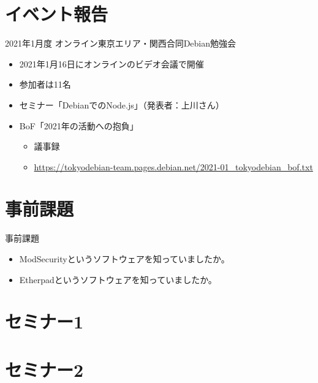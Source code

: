 \section{イベント報告}

\begin{frame}{2021年1月度 オンライン東京エリア・関西合同Debian勉強会}
\begin{itemize}
\item 2021年1月16日にオンラインのビデオ会議で開催
\item 参加者は11名
\item セミナー「DebianでのNode.js」（発表者：上川さん）
\item BoF「2021年の活動への抱負」
  \begin{itemize}
  \item 議事録
  \item \url{https://tokyodebian-team.pages.debian.net/2021-01_tokyodebian_bof.txt}
  \end{itemize}
\end{itemize}
\end{frame}


\section{事前課題}


\begin{frame}{事前課題}
  \begin{itemize}
  \item ModSecurityというソフトウェアを知っていましたか。
  \item Etherpadというソフトウェアを知っていましたか。
  \end{itemize}
\end{frame}

{\footnotesize
 
}

%

\section{セミナー1}

\section{セミナー2}

